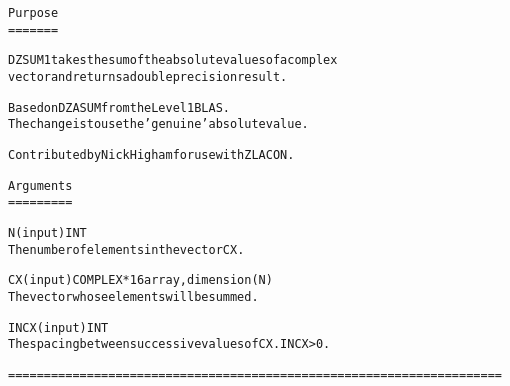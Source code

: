 \small\begin{alltt}
    Purpose   
    =======\end{alltt}\normalsize 


\small\begin{alltt}    DZSUM1 takes the sum of the absolute values of a complex   
    vector and returns a double precision result.\end{alltt}\normalsize 


\small\begin{alltt}    Based on DZASUM from the Level 1 BLAS.   
    The change is to use the 'genuine' absolute value.\end{alltt}\normalsize 


\small\begin{alltt}    Contributed by Nick Higham for use with ZLACON.\end{alltt}\normalsize 


\small\begin{alltt}    Arguments   
    =========\end{alltt}\normalsize 


\small\begin{alltt}    N       (input) INT   
            The number of elements in the vector CX.\end{alltt}\normalsize 


\small\begin{alltt}    CX      (input) COMPLEX*16 array, dimension (N)   
            The vector whose elements will be summed.\end{alltt}\normalsize 


\small\begin{alltt}    INCX    (input) INT   
            The spacing between successive values of CX.  INCX > 0.\end{alltt}\normalsize 


\small\begin{alltt}    ===================================================================== 
\end{alltt}\normalsize 
 